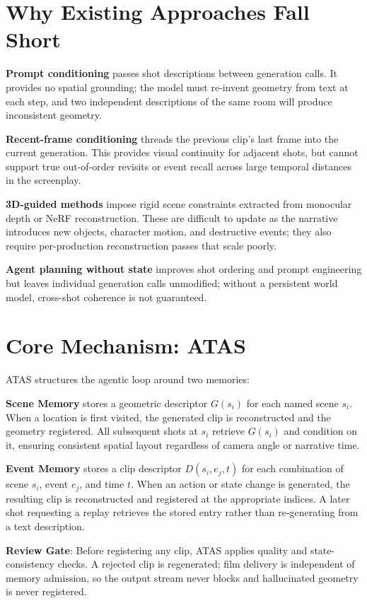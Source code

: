 \documentclass[10pt,twocolumn]{article}
\begin{document}
\section{Why Existing Approaches Fall Short}

\textbf{Prompt conditioning} passes shot descriptions between generation calls.
It provides no spatial grounding; the model must re-invent geometry from text at
each step, and two independent descriptions of the same room will produce
inconsistent geometry.

\textbf{Recent-frame conditioning} threads the previous clip's last frame into
the current generation. This provides visual continuity for adjacent shots, but
cannot support true out-of-order revisits or event recall across large temporal
distances in the screenplay.

\textbf{3D-guided methods} impose rigid scene constraints extracted from
monocular depth or NeRF reconstruction. These are difficult to update as the
narrative introduces new objects, character motion, and destructive events; they
also require per-production reconstruction passes that scale poorly.

\textbf{Agent planning without state} improves shot ordering and prompt
engineering but leaves individual generation calls unmodified; without a
persistent world model, cross-shot coherence is not guaranteed.

\section{Core Mechanism: ATAS}

ATAS structures the agentic loop around two memories:

\textbf{Scene Memory} stores a geometric descriptor $G(s_i)$ for each named
scene $s_i$. When a location is first visited, the generated clip is
reconstructed and the geometry registered. All subsequent shots at $s_i$
retrieve $G(s_i)$ and condition on it, ensuring consistent spatial layout
regardless of camera angle or narrative time.

\textbf{Event Memory} stores a clip descriptor $D(s_i, e_j, t)$ for each
combination of scene $s_i$, event $e_j$, and time $t$. When an action or
state change is generated, the resulting clip is reconstructed and registered
at the appropriate indices. A later shot requesting a replay retrieves the
stored entry rather than re-generating from a text description.

\textbf{Review Gate}: Before registering any clip, ATAS applies quality
and state-consistency checks. A rejected clip is regenerated; film delivery is
independent of memory admission, so the output stream never blocks and
hallucinated geometry is never registered.
\end{document}
